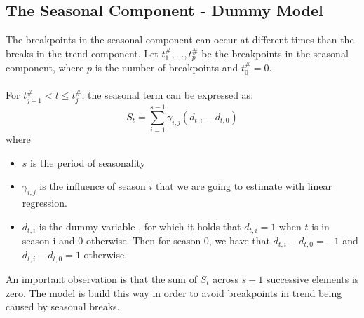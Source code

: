 \documentclass[main.tex]{subfiles}
\begin{document}
\subsection{The Seasonal Component - Dummy Model}
\label{subsec:seasonal_dummy}
The breakpoints in the seasonal component can occur at different times than the
breaks in the trend component. Let
$t_1^{\#},\hdots, t_p^{\#}$ be the breakpoints in the seasonal component,
where $p$ is the number of breakpoints and $t_0^{\#} = 0$.\\\\
For $t_{j-1}^{\#} < t \leq t_j^{\#}$, the seasonal term can be expressed as:
\[
S_t = \sum_{i=1}^{s-1}\gamma_{i,j}(d_{t, i} - d_{t, 0})
\]
where
\begin{itemize}
\item $s$ is the period of seasonality
\item $\gamma_{i,j}$  is the influence of season $i$ that we are going to estimate
with linear regression. 
\item $d_{t,i}$ is the dummy variable \cite{makridakis}, for which it holds that
  $d_{t,i} = 1$ when $t$ is in season i and 0 otherwise. Then for season 0, we
  have that $d_{t, i} - d_{t, 0} = -1$ and $d_{t, i} - d_{t, 0} = 1$ otherwise.
\end{itemize}
An important observation is that the sum of $S_t$ across $s-1$ successive elements is zero.
The model is build this way in order to avoid breakpoints in
trend being caused by seasonal breaks. \\\\
\end{document}
